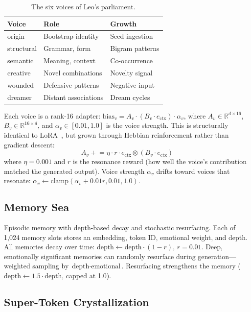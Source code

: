 \documentclass[11pt,twocolumn]{article}
\begin{document}
\begin{table}[h]
\centering
\small
\begin{tabular}{lll}
\toprule
Voice & Role & Growth \\
\midrule
origin & Bootstrap identity & Seed ingestion \\
structural & Grammar, form & Bigram patterns \\
semantic & Meaning, context & Co-occurrence \\
creative & Novel combinations & Novelty signal \\
wounded & Defensive patterns & Negative input \\
dreamer & Distant associations & Dream cycles \\
\bottomrule
\end{tabular}
\caption{The six voices of Leo's parliament.}
\label{tab:voices}
\end{table}

Each voice is a rank-16 adapter: $\text{bias}_v = A_v \cdot (B_v \cdot e_{\text{ctx}}) \cdot \alpha_v$, where $A_v \in \mathbb{R}^{d \times 16}$, $B_v \in \mathbb{R}^{16 \times d}$, and $\alpha_v \in [0.01, 1.0]$ is the voice strength. This is structurally identical to LoRA~\citep{hu2022lora}, but grown through Hebbian reinforcement rather than gradient descent:
\begin{equation}
  A_v \mathrel{+}= \eta \cdot r \cdot e_{\text{ctx}} \otimes (B_v \cdot e_{\text{ctx}})
\end{equation}
where $\eta = 0.001$ and $r$ is the resonance reward (how well the voice's contribution matched the generated output). Voice strength $\alpha_v$ drifts toward voices that resonate: $\alpha_v \leftarrow \text{clamp}(\alpha_v + 0.01r, 0.01, 1.0)$.

\subsection{Memory Sea}

Episodic memory with depth-based decay and stochastic resurfacing. Each of 1,024 memory slots stores an embedding, token ID, emotional weight, and depth. All memories decay over time: $\text{depth} \leftarrow \text{depth} \cdot (1 - r)$, $r = 0.01$. Deep, emotionally significant memories can randomly resurface during generation---weighted sampling by $\text{depth} \cdot \text{emotional}$. Resurfacing strengthens the memory ($\text{depth} \leftarrow 1.5 \cdot \text{depth}$, capped at 1.0).

\subsection{Super-Token Crystallization}
\end{document}
